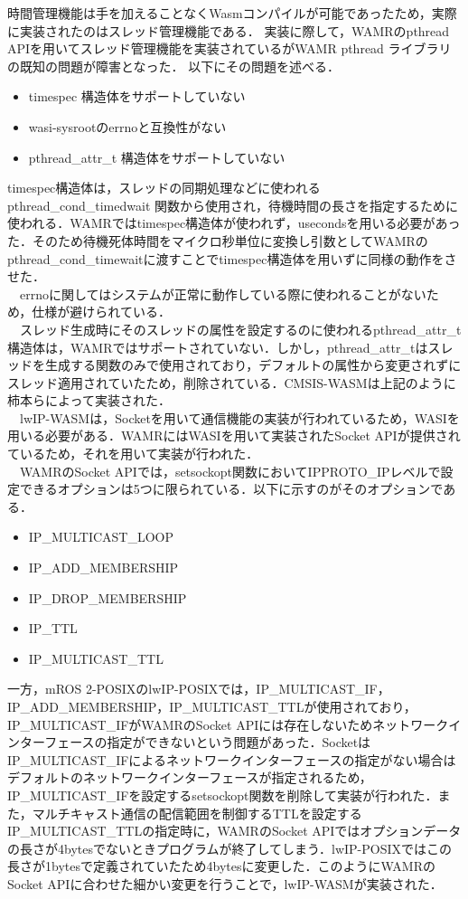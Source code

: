 時間管理機能は手を加えることなくWasmコンパイルが可能であったため，実際に実装されたのはスレッド管理機能である．
実装に際して，WAMRのpthread APIを用いてスレッド管理機能を実装されているがWAMR pthread ライブラリの既知の問題が障害となった．
以下にその問題を述べる．
\begin{itemize}
    \item timespec 構造体をサポートしていない
    \item wasi-sysrootのerrnoと互換性がない
    \item pthread\_attr\_t 構造体をサポートしていない
\end{itemize}
timespec構造体は，スレッドの同期処理などに使われるpthread\_cond\_timedwait 関数から使用され，待機時間の長さを指定するために使われる．WAMRではtimespec構造体が使われず，usecondsを用いる必要があった．そのため待機死体時間をマイクロ秒単位に変換し引数としてWAMRのpthread\_cond\_timewaitに渡すことでtimespec構造体を用いずに同様の動作をさせた．
\\　errnoに関してはシステムが正常に動作している際に使われることがないため，仕様が避けられている．
\\　スレッド生成時にそのスレッドの属性を設定するのに使われるpthread\_attr\_t構造体は，WAMRではサポートされていない．しかし，pthread\_attr\_tはスレッドを生成する関数のみで使用されており，デフォルトの属性から変更されずにスレッド適用されていたため，削除されている．CMSIS-WASMは上記のように柿本らによって実装された．
\\　lwIP-WASMは，Socketを用いて通信機能の実装が行われているため，WASIを用いる必要がある．WAMRにはWASIを用いて実装されたSocket APIが提供されているため，それを用いて実装が行われた．
\\　WAMRのSocket APIでは，setsockopt関数においてIPPROTO\_IPレベルで設定できるオプションは5つに限られている．以下に示すのがそのオプションである．
\begin{itemize}
    \item IP\_MULTICAST\_LOOP
    \item IP\_ADD\_MEMBERSHIP
    \item IP\_DROP\_MEMBERSHIP
    \item IP\_TTL
    \item IP\_MULTICAST\_TTL
\end{itemize}
一方，mROS 2-POSIXのlwIP-POSIXでは，IP\_MULTICAST\_IF，IP\_ADD\_MEMBERSHIP，IP\_MULTICAST\_TTLが使用されており，IP\_MULTICAST\_IFがWAMRのSocket APIには存在しないためネットワークインターフェースの指定ができないという問題があった．SocketはIP\_MULTICAST\_IFによるネットワークインターフェースの指定がない場合はデフォルトのネットワークインターフェースが指定されるため，IP\_MULTICAST\_IFを設定するsetsockopt関数を削除して実装が行われた．また，マルチキャスト通信の配信範囲を制御するTTLを設定するIP\_MULTICAST\_TTLの指定時に，WAMRのSocket APIではオプションデータの長さが4bytesでないときプログラムが終了してしまう．lwIP-POSIXではこの長さが1bytesで定義されていたため4bytesに変更した．このようにWAMRのSocket APIに合わせた細かい変更を行うことで，lwIP-WASMが実装された．

